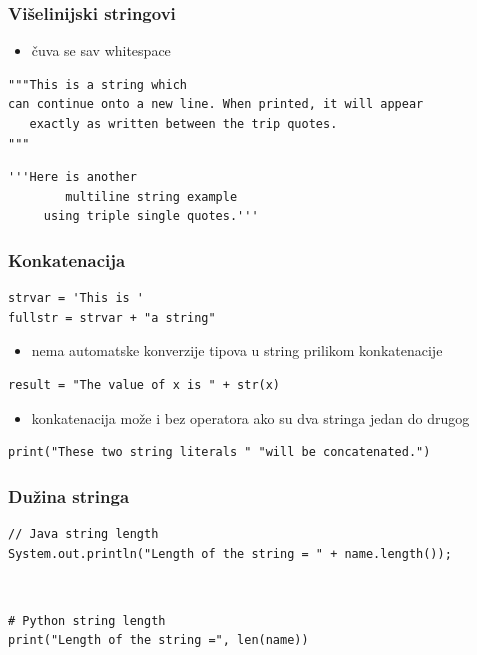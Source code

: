 \documentclass[compress]{beamer}
\begin{document}
\begin{frame}[fragile]
\frametitle{Višelinijski stringovi}
\begin{itemize}
  \item čuva se sav whitespace
\end{itemize}
\begin{verbatim}
"""This is a string which
can continue onto a new line. When printed, it will appear
   exactly as written between the trip quotes.
"""
\end{verbatim}
\begin{verbatim}
'''Here is another
        multiline string example 
     using triple single quotes.'''
\end{verbatim}
\end{frame}

\begin{frame}[fragile]
\frametitle{Konkatenacija}
\begin{verbatim}
strvar = 'This is '
fullstr = strvar + "a string"
\end{verbatim}
\begin{itemize}
  \item nema automatske konverzije tipova u string prilikom konkatenacije
\end{itemize}
\begin{verbatim}
result = "The value of x is " + str(x)
\end{verbatim}
\begin{itemize}
  \item konkatenacija može i bez operatora ako su dva stringa jedan do drugog
\end{itemize}
\begin{verbatim}
print("These two string literals " "will be concatenated.")
\end{verbatim}
\end{frame}

\begin{frame}[fragile]
\frametitle{Dužina stringa}
\begin{verbatim}
// Java string length
System.out.println("Length of the string = " + name.length());
\end{verbatim}

\ %

\begin{verbatim}
# Python string length
print("Length of the string =", len(name))
\end{verbatim}
\end{frame}
\end{document}
